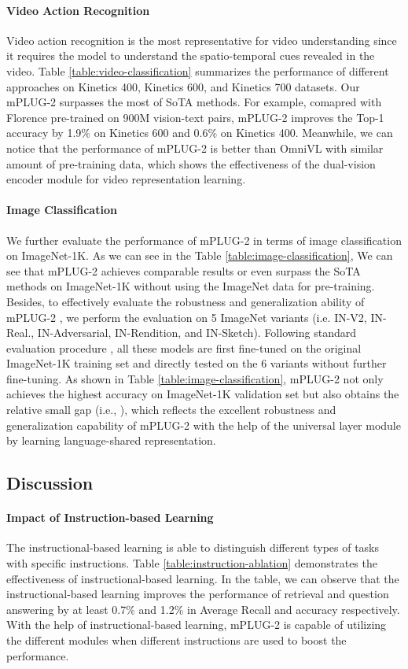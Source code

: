 \documentclass{article}
\theoremstyle{plain}
\theoremstyle{definition}
\theoremstyle{remark}
\newcommand{\modelname}{mPLUG-2 }
\begin{document}
 \paragraph{Video Action Recognition}
Video action recognition is the most representative for video understanding since it requires the model to understand the spatio-temporal cues revealed in the video. Table \ref{table:video-classification} summarizes the performance of different approaches on Kinetics 400, Kinetics 600, and Kinetics 700 datasets. Our \modelname surpasses the most of SoTA methods. For example, comapred with Florence pre-trained on 900M vision-text pairs, \modelname improves the Top-1 accuracy by 1.9\% on Kinetics 600 and 0.6\% on Kinetics 400. Meanwhile, we can notice that the performance of \modelname is better than OmniVL with similar amount of pre-training data, which shows the effectiveness of the dual-vision encoder module for video representation learning.

\paragraph{Image Classification}
We further evaluate the performance of \modelname in terms of image classification on ImageNet-1K. As we can see in the Table \ref{table:image-classification}, We can see that \modelname achieves comparable results or even surpass the SoTA methods on ImageNet-1K without using the ImageNet data for pre-training. Besides, to effectively evaluate the robustness and generalization ability of \modelname, we perform the evaluation on 5 ImageNet variants (i.e. IN-V2, IN-Real., IN-Adversarial, IN-Rendition, and IN-Sketch). Following standard evaluation procedure \citep{Fang2022EVA}, all these models are first fine-tuned on the original ImageNet-1K training set and directly tested on the 6 variants without further fine-tuning. As shown in Table \ref{table:image-classification}, \modelname not only achieves the highest accuracy on ImageNet-1K validation set but also obtains the relative small gap (i.e., ), which reflects the excellent robustness and generalization capability of \modelname with the help of the universal layer module by learning language-shared representation.


\subsection{Discussion}
\paragraph{Impact of Instruction-based Learning}
The instructional-based learning is able to distinguish different types of tasks with specific instructions. Table \ref{table:instruction-ablation} demonstrates the effectiveness of instructional-based learning. In the table, we can observe that the instructional-based learning improves the performance of retrieval and question answering by at least 0.7\% and 1.2\% in Average Recall and accuracy respectively. With the help of instructional-based learning, \modelname is capable of utilizing the different modules when different instructions are used to boost the performance.
\end{document}
